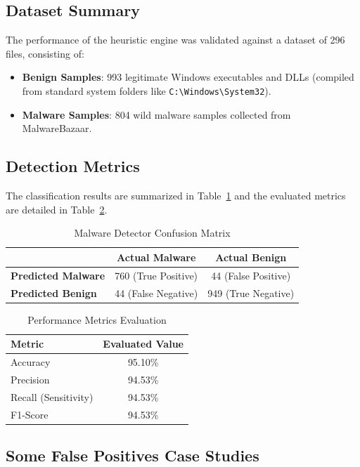 \documentclass[11pt,a4paper]{article}
\begin{document}
\subsection{Dataset Summary}
The performance of the heuristic engine was validated against a dataset of 296 files, consisting of:
\begin{itemize}
    \item \textbf{Benign Samples}: 993 legitimate Windows executables and DLLs (compiled from standard system folders like \texttt{C:\textbackslash{}Windows\textbackslash{}System32}).
    \item \textbf{Malware Samples}: 804 wild malware samples collected from MalwareBazaar.
\end{itemize}

\subsection{Detection Metrics}
The classification results are summarized in Table~\ref{tab:confusion} and the evaluated metrics are detailed in Table~\ref{tab:metrics}.

\begin{table}[h]
\centering
\caption{Malware Detector Confusion Matrix}
\label{tab:confusion}
\begin{tabular}{lcc}
\toprule
& \textbf{Actual Malware} & \textbf{Actual Benign} \\
\midrule
\textbf{Predicted Malware} & 760 (True Positive) & 44 (False Positive) \\
\textbf{Predicted Benign} & 44 (False Negative) & 949 (True Negative) \\
\bottomrule
\end{tabular}
\end{table}

\begin{table}[h]
\centering
\caption{Performance Metrics Evaluation}
\label{tab:metrics}
\begin{tabular}{lc}
\toprule
\textbf{Metric} & \textbf{Evaluated Value} \\
\midrule
Accuracy & 95.10\% \\
Precision & 94.53\% \\
Recall (Sensitivity) & 94.53\% \\
F1-Score & 94.53\% \\
\bottomrule
\end{tabular}
\end{table}

\subsection{Some False Positives Case Studies}
\end{document}
